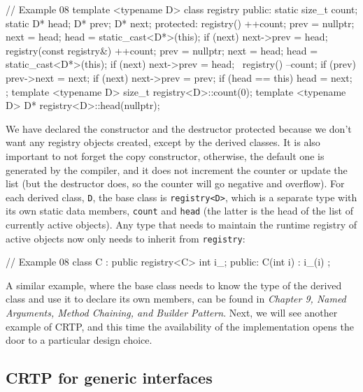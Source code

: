 \begin{code}
// Example 08
template <typename D> class registry {
  public:
  static size_t count;
  static D* head;
  D* prev;
  D* next;
  protected:
  registry() {
    ++count;
    prev = nullptr;
    next = head;
    head = static_cast<D*>(this);
    if (next) next->prev = head;
  }
  registry(const registry&) {
    ++count;
    prev = nullptr;
    next = head;
    head = static_cast<D*>(this);
    if (next) next->prev = head;
  }
  ~registry() {
    --count;
    if (prev) prev->next = next;
    if (next) next->prev = prev;
    if (head == this) head = next;
  }
};
template <typename D> size_t registry<D>::count(0);
template <typename D> D* registry<D>::head(nullptr);
\end{code}

We have declared the constructor and the destructor protected because we don't want any registry objects created, except by the derived classes. It is also important to not forget the copy constructor, otherwise, the default one is generated by the compiler, and it does not increment the counter or update the list (but the destructor does, so the counter will go negative and overflow). For each derived class, \texttt{D}, the base class is \texttt{registry\textless{}D\textgreater{}}, which is a separate type with its own static data members, \texttt{count} and \texttt{head} (the latter is the head of the list of currently active objects). Any type that needs to maintain the runtime registry of active objects now only needs to inherit from \texttt{registry}:

\begin{code}
// Example 08
class C : public registry<C> {
  int i_;
  public:
  C(int i) : i_(i) {}
};
\end{code}

A similar example, where the base class needs to know the type of the derived class and use it to declare its own members, can be found in \emph{Chapter 9, Named Arguments, Method Chaining, and Builder Pattern}. Next, we will see another example of CRTP, and this time the availability of the implementation opens the door to a particular design choice.

\subsection{CRTP for generic interfaces}

